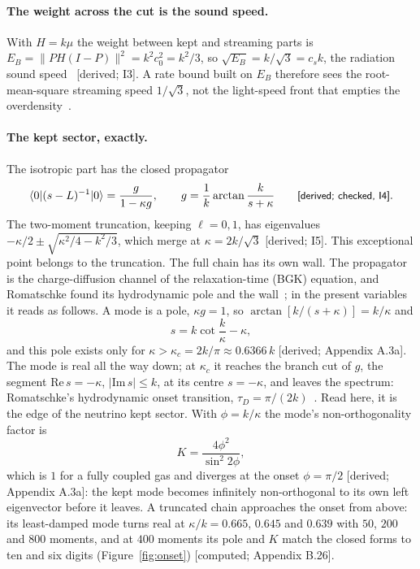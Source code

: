 \documentclass[11pt]{article}
\newcommand{\grade}[1]{\textsf{\small[#1]}}
\begin{document}
\paragraph{The weight across the cut is the sound speed.} With $H=k\mu$ the weight between kept and streaming parts is $E_B=\lVert PH(I-P)\rVert^2=k^2c_0^2=k^2/3$, so $\sqrt{E_B}=k/\sqrt3=c_s k$, the radiation sound speed~\cite{WB} \grade{derived; I3}. A rate bound built on $E_B$ therefore sees the root-mean-square streaming speed $1/\sqrt3$, not the light-speed front that empties the overdensity~\cite{OSL}.

\paragraph{The kept sector, exactly.} The isotropic part has the closed propagator
\begin{equation}
\langle0|(s-L)^{-1}|0\rangle=\frac{g}{1-\kappa g},\qquad g=\frac1k\arctan\frac{k}{s+\kappa}\qquad\text{\grade{derived; checked, I4}}.
\end{equation}
The two-moment truncation, keeping $\ell=0,1$, has eigenvalues $-\kappa/2\pm\sqrt{\kappa^2/4-k^2/3}$, which merge at $\kappa=2k/\sqrt3$ \grade{derived; I5}. This exceptional point belongs to the truncation. The full chain has its own wall. The propagator is the charge-diffusion channel of the relaxation-time (BGK) equation, and Romatschke found its hydrodynamic pole and the wall~\cite[Eq.~(37)]{Rom}; in the present variables it reads as follows. A mode is a pole, $\kappa g=1$, so $\arctan[k/(s+\kappa)]=k/\kappa$ and
\begin{equation}
s=k\cot\frac{k}{\kappa}-\kappa,
\end{equation}
and this pole exists only for $\kappa>\kappa_c=2k/\pi\approx0.6366\,k$ \grade{derived; Appendix A.3a}. The mode is real all the way down; at $\kappa_c$ it reaches the branch cut of $g$, the segment $\mathrm{Re}\,s=-\kappa$, $|\mathrm{Im}\,s|\le k$, at its centre $s=-\kappa$, and leaves the spectrum: Romatschke's hydrodynamic onset transition, $\tau_D=\pi/(2k)$~\cite{Rom,Hu}. Read here, it is the edge of the neutrino kept sector. With $\phi=k/\kappa$ the mode's non-orthogonality factor is
\begin{equation}
K=\frac{4\phi^2}{\sin^2 2\phi},
\end{equation}
which is $1$ for a fully coupled gas and diverges at the onset $\phi=\pi/2$ \grade{derived; Appendix A.3a}: the kept mode becomes infinitely non-orthogonal to its own left eigenvector before it leaves. A truncated chain approaches the onset from above: its least-damped mode turns real at $\kappa/k=0.665$, $0.645$ and $0.639$ with $50$, $200$ and $800$ moments, and at $400$ moments its pole and $K$ match the closed forms to ten and six digits (Figure~\ref{fig:onset}) \grade{computed; Appendix B.26}.
\end{document}
